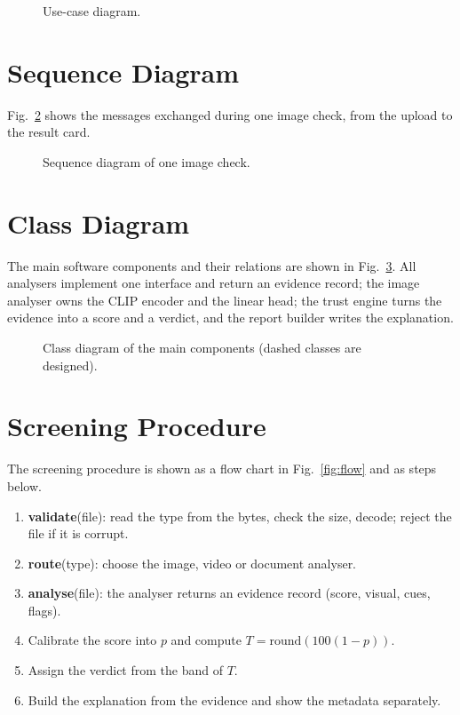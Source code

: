 \begin{figure}[htbp]
  \centering
  
  \caption{Use-case diagram.}\label{fig:uc}
\end{figure}

\section{Sequence Diagram}
Fig.~\ref{fig:seq} shows the messages exchanged during one image check, from the upload to the result card.

\begin{figure}[htbp]
  \centering
  
  \caption{Sequence diagram of one image check.}\label{fig:seq}
\end{figure}

\section{Class Diagram}
The main software components and their relations are shown in Fig.~\ref{fig:class}. All analysers implement one interface and return an evidence record; the image analyser owns the CLIP encoder and the linear head; the trust engine turns the evidence into a score and a verdict, and the report builder writes the explanation.

\begin{figure}[htbp]
  \centering
  
  \caption{Class diagram of the main components (dashed classes are designed).}\label{fig:class}
\end{figure}

\section{Screening Procedure}
The screening procedure is shown as a flow chart in Fig.~\ref{fig:flow} and as steps below.

\begin{enumerate}
  \item \textbf{validate}(file): read the type from the bytes, check the size, decode; reject the file if it is corrupt.
  \item \textbf{route}(type): choose the image, video or document analyser.
  \item \textbf{analyse}(file): the analyser returns an evidence record (score, visual, cues, flags).
  \item Calibrate the score into $p$ and compute $T=\mathrm{round}(100(1-p))$.
  \item Assign the verdict from the band of $T$.
  \item Build the explanation from the evidence and show the metadata separately.
\end{enumerate}

